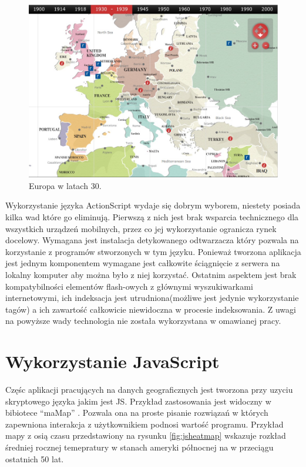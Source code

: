 \begin{figure}[H]
  \centering
    \includegraphics[width=130mm]{ge/archives.jpg}
  \caption{Europa w latach 30.}
  \label{fig:flasheurope}
\end{figure}


Wykorzystanie języka ActionScript wydaje się dobrym wyborem, niestety posiada kilka wad które go eliminują. Pierwszą z nich jest brak wsparcia technicznego dla wszystkich urządzeń mobilnych, przez co jej wykorzystanie ogranicza rynek docelowy.
Wymagana jest instalacja detykowanego odtwarzacza który pozwala na korzystanie z programów stworzonych w tym języku.
Ponieważ tworzona aplikacja jest jednym komponentem wymagane jest całkowite ściągnięcie z serwera na lokalny komputer aby można było z niej korzystać. Ostatnim aspektem jest brak kompatybilności elementów flash-owych z głównymi wyszukiwarkami internetowymi, ich indeksacja jest utrudniona(możliwe jest jedynie wykorzystanie tagów) a ich zawartość całkowicie niewidoczna w procesie indeksowania. Z uwagi na powyższe wady technologia nie została wykorzystana w omawianej pracy.

\section{Wykorzystanie JavaScript}
\label{sec:pref}

Częśc aplikacji pracujących na danych geograficznych jest tworzona przy uzyciu skryptowego języka jakim jest JS. Przykład zastosowania jest widoczny w bibiotece ``maMap'' \cite{jsmapapp}. Pozwala ona na proste pisanie rozwiązań w których zapewniona interakcja z użytkownikiem podnosi wartość programu. Przykład mapy z osią czasu przedstawiony na rysunku \ref{fig:jsheatmap} wskazuje rozkład średniej rocznej temepratury w stanach ameryki północnej na w przeciągu ostatnich 50 lat.

